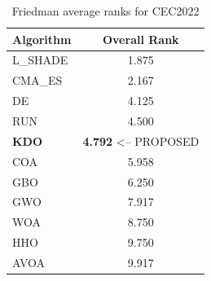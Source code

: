 \begin{table}[H]
\centering\small
\caption{Friedman average ranks for CEC2022}
\label{tab:cec2022_friedman}
\begin{tabular}{lc}
\toprule
\textbf{Algorithm} & \textbf{Overall Rank} \\
\midrule
L_SHADE & 1.875 \\
CMA_ES & 2.167 \\
DE & 4.125 \\
RUN & 4.500 \\
\textbf{KDO} & \textbf{4.792}  <-- PROPOSED \\
COA & 5.958 \\
GBO & 6.250 \\
GWO & 7.917 \\
WOA & 8.750 \\
HHO & 9.750 \\
AVOA & 9.917 \\
\bottomrule
\end{tabular}
\end{table}
